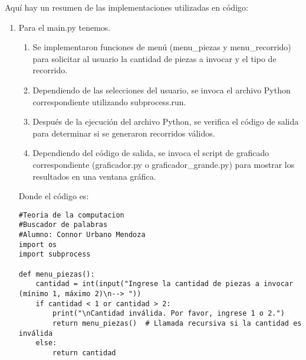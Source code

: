 Aquí hay un resumen de las implementaciones utilizadas en código:\newline
\\
\begin{enumerate}
\item Para el main.py tenemos.\newline
\begin{enumerate}
    \item Se implementaron funciones de menú (menu\_piezas y menu\_recorrido) para solicitar al usuario la cantidad de piezas a invocar y el tipo de recorrido.\newline
    \item Dependiendo de las selecciones del usuario, se invoca el archivo Python correspondiente utilizando subprocess.run.\newline
    \item Después de la ejecución del archivo Python, se verifica el código de salida para determinar si se generaron recorridos válidos.\newline
    \item Dependiendo del código de salida, se invoca el script de graficado correspondiente (graficador.py o graficador\_grande.py) para mostrar los resultados en una ventana gráfica.\newline
\end{enumerate}

Donde el código es:\newline

\begin{lstlisting}
#Teoria de la computacion
#Buscador de palabras
#Alumno: Connor Urbano Mendoza
import os
import subprocess

def menu_piezas():
    cantidad = int(input("Ingrese la cantidad de piezas a invocar (mínimo 1, máximo 2)\n--> "))
    if cantidad < 1 or cantidad > 2:
        print("\nCantidad inválida. Por favor, ingrese 1 o 2.")
        return menu_piezas()  # Llamada recursiva si la cantidad es inválida
    else:
        return cantidad


\end{lstlisting}
\end{enumerate}
